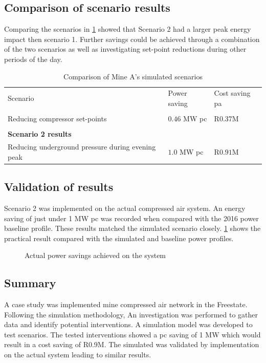 \subsection{Comparison of scenario results}
Comparing the scenarios in \cref{Table: A Comparison} showed that Scenario 2 had a larger peak energy impact then scenario 1. Further savings could be achieved through a combination of the two scenarios as well as investigating set-point reductions during other periods of the day.
\begin{table}[h!]
	\centering
	\begin{tabular}{p{}
			p{}
			p{}}
		\hline 
		Scenario  &  Power saving & Cost saving \gls{pa}  \\
		\hhline{===} 
		\multicolumn{3}{l}{\textbf{Scenario 1 results}} \\
		Reducing compressor set-points & $ 0.46 $ MW \gls{pc} & R0.37M \\
		\\
		\multicolumn{3}{l}{\textbf{Scenario 2 results}}  \\
		Reducing underground pressure during evening peak& $ 1.0 $ MW \gls{pc} & R$ 0.91 $M\\
		\hline
	\end{tabular}
	\caption{Comparison of Mine A's simulated scenarios}
	\label{Table: A Comparison}
\end{table}

\subsection{Validation of results}
Scenario 2 was implemented on the actual compressed air system. An energy saving of just under 1 MW \gls{pc} was recorded when compared with the 2016 power baseline profile. These results matched the simulated scenario closely. \cref{fig: Actual permormance beet} shows the practical result compared with the simulated and baseline power profiles.
\begin{figure}[h]
	\centering
	
	\caption{Actual power savings achieved on the system}
	\label{fig: Actual permormance beet}
\end{figure}
\subsection{Summary}
A case study was implemented mine compressed air network in the Freestate. Following the simulation methodology, An investigation was performed to gather data and identify potential interventions. A simulation model was developed to test scenarios. The tested interventions showed a \gls{pc} saving of 1 MW which would result in a cost saving of R0.9M. The simulated was validated by implementation on the actual system leading to similar results.
